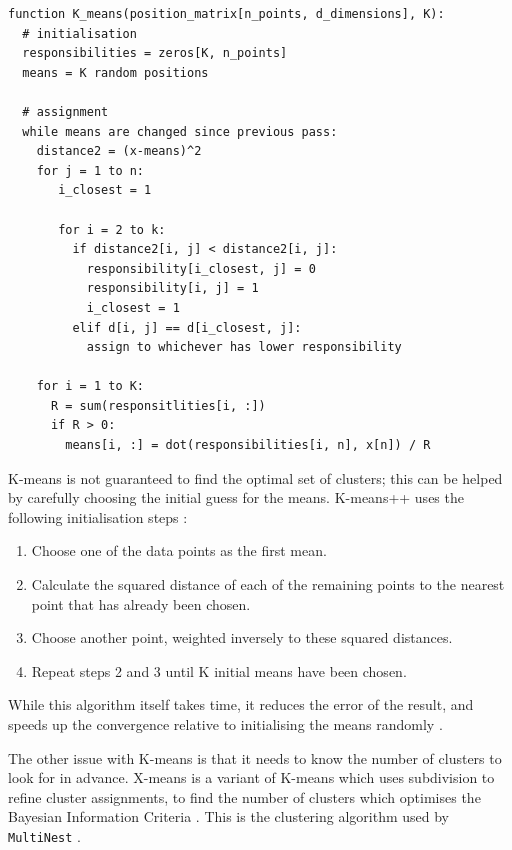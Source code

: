 \documentclass{article}
\begin{document}
\begin{verbatim}
function K_means(position_matrix[n_points, d_dimensions], K):
  # initialisation
  responsibilities = zeros[K, n_points]
  means = K random positions
  
  # assignment
  while means are changed since previous pass:
    distance2 = (x-means)^2
    for j = 1 to n:
       i_closest = 1
       
       for i = 2 to k:
         if distance2[i, j] < distance2[i, j]:
           responsibility[i_closest, j] = 0
           responsibility[i, j] = 1
           i_closest = 1
         elif d[i, j] == d[i_closest, j]:
           assign to whichever has lower responsibility
           
    for i = 1 to K:
      R = sum(responsitlities[i, :])
      if R > 0:
        means[i, :] = dot(responsibilities[i, n], x[n]) / R
\end{verbatim}
 
K-means is not guaranteed to find the optimal set of clusters; this can be helped by carefully choosing the initial guess for the means. K-means++ uses the following initialisation steps \cite{kmeans++}:
\begin{enumerate}
  \item Choose one of the data points as the first mean.
  \item Calculate the squared distance of each of the remaining points to the nearest point that has already been chosen.
  \item Choose another point, weighted inversely to these squared distances.
  \item Repeat steps 2 and 3 until K initial means have been chosen.
\end{enumerate}
While this algorithm itself takes time, it reduces the error of the result, and speeds up the convergence relative to initialising the means randomly \cite{kmeans++}.

The other issue with K-means is that it needs to know the number of clusters to look for in advance. X-means is a variant of K-means which uses subdivision to refine cluster assignments, to find the number of clusters which optimises the Bayesian Information Criteria \cite{bic}. This is the clustering algorithm used by \texttt{MultiNest} \cite{Feroz_2008}.
\end{document}
